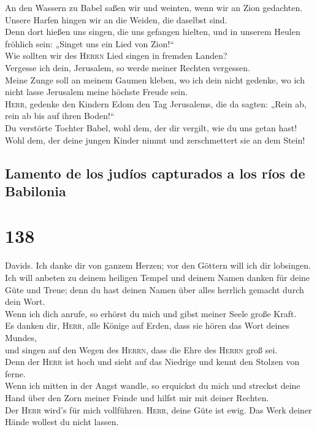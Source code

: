  An den Wassern zu Babel saßen wir und weinten, wenn wir
an Zion gedachten.\\
 Unsere Harfen hingen wir an die Weiden, die daselbst
sind.\\
 Denn dort hießen uns singen, die uns gefangen hielten,
und in unserem Heulen fröhlich sein: „Singet uns ein Lied von
Zion!{}``\\
 Wie sollten wir des \textsc{Herrn} Lied singen in fremden
Landen?\\
 Vergesse ich dein, Jerusalem, so werde meiner Rechten
vergessen.\\
 Meine Zunge soll an meinem Gaumen kleben, wo ich dein
nicht gedenke, wo ich nicht lasse Jerusalem meine höchste Freude sein.\\
 \textsc{Herr}, gedenke den Kindern Edom den Tag
Jerusalems, die da sagten: „Rein ab, rein ab bis auf ihren Boden!{}``\\
 Du verstörte Tochter Babel, wohl dem, der dir vergilt,
wie du uns getan hast!\\
 Wohl dem, der deine jungen Kinder nimmt und zerschmettert
sie an dem Stein!

\hypertarget{lamento-de-los-juduxedos-capturados-a-los-ruxedos-de-babilonia-1}{%
\subsection{Lamento de los judíos capturados a los ríos de
Babilonia}\label{lamento-de-los-juduxedos-capturados-a-los-ruxedos-de-babilonia-1}}

\hypertarget{section-137}{%
\section{138}\label{section-137}}

 Davids. Ich danke dir von ganzem Herzen; vor den Göttern
will ich dir lobsingen.\\
 Ich will anbeten zu deinem heiligen Tempel und deinem
Namen danken für deine Güte und Treue; denn du hast deinen Namen über
alles herrlich gemacht durch dein Wort.\\
 Wenn ich dich anrufe, so erhörst du mich und gibst meiner
Seele große Kraft.\\
 Es danken dir, \textsc{Herr}, alle Könige auf Erden, dass
sie hören das Wort deines Mundes,\\
 und singen auf den Wegen des \textsc{Herrn}, dass die
Ehre des \textsc{Herrn} groß sei.\\
 Denn der \textsc{Herr} ist hoch und sieht auf das
Niedrige und kennt den Stolzen von ferne.\\
 Wenn ich mitten in der Angst wandle, so erquickst du mich
und streckst deine Hand über den Zorn meiner Feinde und hilfst mir mit
deiner Rechten.\\
 Der \textsc{Herr} wird's für mich vollführen.
\textsc{Herr}, deine Güte ist ewig. Das Werk deiner Hände wollest du
nicht lassen.

